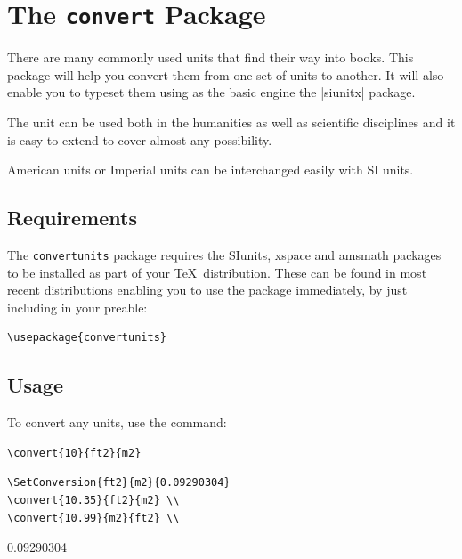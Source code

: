 \documentclass{tufte-book}
\def\convertunits{\texttt{convertunits}\xspace}
\gdef\SetConversion#1#2#3{%
\expandafter\gdef\csname#1#2\endcsname{#3}%
\gdef\Temp{#3}
\FPdiv\invert{1}{\Temp}
\expandafter\gdef\csname#2#1\endcsname{\invert}
}
\begin{document}
\makeatletter

\chapter{The \texttt{convert} Package}

There are many commonly used units that find their way into books. This package will help you convert them from one set of units to another. It will also enable you to typeset them using as the basic engine the |siunitx| package.

The unit can be used both in the humanities as well as scientific disciplines and it is easy to extend to cover almost any possibility.

American units or Imperial units can be interchanged easily with SI units.

\section{Requirements}
The \convertunits package  requires the SIunits, xspace and amsmath packages to be installed as part
of your \TeX\ distribution. These can be found in most recent distributions enabling you to use the package immediately, by just including in your preable:

\begin{verbatim}
\usepackage{convertunits}
\end{verbatim}

\section{Usage}
To convert any units, use the command:

\begin{verbatim}
\convert{10}{ft2}{m2}
\end{verbatim}


\begin{verbatim}
\SetConversion{ft2}{m2}{0.09290304}
\convert{10.35}{ft2}{m2} \\
\convert{10.99}{m2}{ft2} \\
\end{verbatim}

\SetConversion{ft2}{m2}{0.09290304}

 \\
\end{document}
